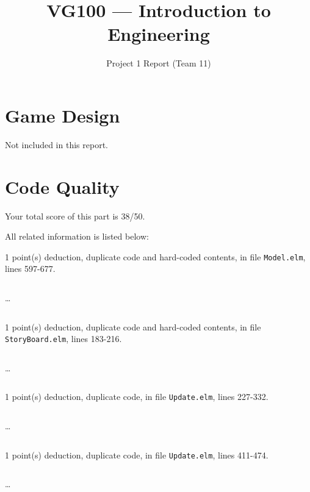 \documentclass{article}
\title{VG100 --- Introduction to\\ Engineering}
\subtitle{Project 1 Report (Team 11)}
\begin{document}
\maketitle

\section{Game Design}

Not included in this report.

\section{Code Quality}

Your total score of this part is 38/50. \medskip

All related information is listed below: \medskip

1 point(s) {\color{red}deduction}, duplicate code and hard-coded contents, in file {\color{blue}\texttt{Model.elm}}, lines {\color{blue}597-677}.

\inputminted[firstline=597,lastline=606]{elm}{Model.elm}

\dots

\inputminted[firstline=668,lastline=677]{elm}{Model.elm}

1 point(s) {\color{red}deduction}, duplicate code and hard-coded contents, in file {\color{blue}\texttt{StoryBoard.elm}}, lines {\color{blue}183-216}.

\inputminted[firstline=183,lastline=192]{elm}{StoryBoard.elm}

\dots

\inputminted[firstline=207,lastline=216]{elm}{StoryBoard.elm}

1 point(s) {\color{red}deduction}, duplicate code, in file {\color{blue}\texttt{Update.elm}}, lines {\color{blue}227-332}.

\inputminted[firstline=227,lastline=236]{elm}{Update.elm}

\dots

\inputminted[firstline=323,lastline=332]{elm}{Update.elm}

1 point(s) {\color{red}deduction}, duplicate code, in file {\color{blue}\texttt{Update.elm}}, lines {\color{blue}411-474}.

\inputminted[firstline=411,lastline=420]{elm}{Update.elm}

\dots

\inputminted[firstline=465,lastline=474]{elm}{Update.elm}
\end{document}
